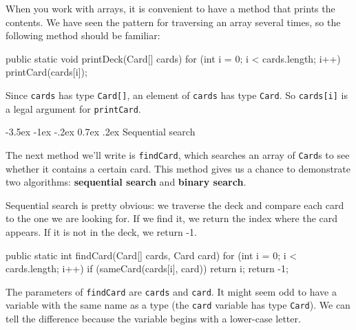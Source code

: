 \documentclass[12pt]{book}
\makeatletter
\theoremstyle{exercise}
\newcommand{\java}[1]{\verb"#1"}
\renewcommand{\section}{\@startsection {section}{1}{\z@}%
    {-3.5ex \@plus -1ex \@minus -.2ex}%
    {0.7ex \@plus.2ex}%
    {\normalfont\Large\bfseries}}
\newcommand{\java}[1]{\lstinline{#1}} %
\makeatother
\begin{document}
\label{printdeck}


When you work with arrays, it is convenient to have a method that prints the contents.
We have seen the pattern for traversing an array several times, so the following method should be familiar:

\begin{code}
    public static void printDeck(Card[] cards) {
        for (int i = 0; i < cards.length; i++) {
            printCard(cards[i]);
        }
    }
\end{code}

Since \java{cards} has type \java{Card[]}, an element of \java{cards} has type \java{Card}.
So \java{cards[i]} is a legal argument for \java{printCard}.


\section{Sequential search}
\label{findcard}


The next method we'll write is \java{findCard}, which searches an array of \java{Card}s to see whether it contains a certain card.
This method gives us a chance to demonstrate two algorithms: {\bf sequential search} and {\bf binary search}.


Sequential search is pretty obvious: we traverse the deck and compare each card to the one we are looking for.
If we find it, we return the index where the card appears.
If it is not in the deck, we return -1.

\begin{code}
public static int findCard(Card[] cards, Card card) {
    for (int i = 0; i < cards.length; i++) {
        if (sameCard(cards[i], card)) {
            return i;
        }
    }
    return -1;
}
\end{code}

The parameters of \java{findCard} are \java{cards} and \java{card}.
It might seem odd to have a variable with the same name as a type (the \java{card} variable has type \java{Card}).
We can tell the difference because the variable begins with a lower-case letter.
\end{document}
